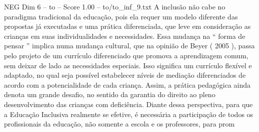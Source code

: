 \begin{textsample}{NEG Dim 6 – to – Score 1.00 – to/to\_inf\_9.txt}
A inclusão não cabe no paradigma tradicional da educação, pois ela requer um modelo diferente das propostas já executadas e uma prática diferenciada, que leve em consideração as crianças em suas individualidades e necessidades.
Essa mudança na “ forma de pensar ” implica numa mudança cultural, que na opinião de Beyer ( 2005 ), passa pelo projeto de um currículo diferenciado que promova a aprendizagem comum, sem deixar de lado as necessidades especiais.
Isso significa um currículo flexível e adaptado, no qual seja possível estabelecer níveis de mediação diferenciados de acordo com a potencialidade de cada criança.
Assim, a prática pedagógica ainda denota um grande desafio, no sentido da garantia do direito ao pleno desenvolvimento das crianças com deficiência.
Diante dessa perspectiva, para que a Educação Inclusiva realmente se efetive, é necessária a participação de todos os profissionais da educação, não somente a escola e os professores, para prom

\end{textsample}

